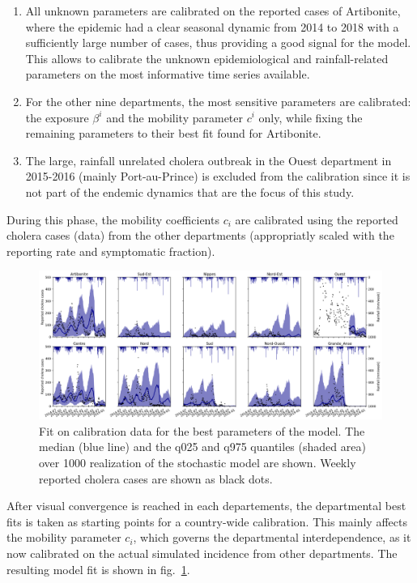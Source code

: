 \begin{enumerate}
    \item All unknown parameters are calibrated on the reported cases of Artibonite, where the epidemic had a clear seasonal dynamic from 2014 to 2018 with a sufficiently large number of cases, thus providing a good signal for the model.  This allows to calibrate the unknown epidemiological and rainfall-related parameters on the most informative time series available.
    \item For the other nine departments, the most sensitive parameters are calibrated: the exposure $\beta^i$ and the mobility parameter $c^i$ only, while fixing the remaining parameters to their best fit found for Artibonite.
    \item The large, rainfall unrelated cholera outbreak in the Ouest department in 2015-2016 (mainly Port-au-Prince)\cite{Rebaudet:NationalAlertresponseStrategy:2018} is excluded from the calibration since it is not part of the endemic dynamics that are the focus of  this study.
\end{enumerate}

During this phase, the mobility coefficients $c_i$ are calibrated using the reported cholera cases (data) from the other departments (appropriatly scaled with the reporting rate and symptomatic fraction).
\begin{figure}[htbp]
\begin{center}
\includegraphics[width=1.0\textwidth]{fig_cholera-haiti-ocv/fit.png}
\caption[Fit on calibration data for the best parameter of the model]{Fit on calibration data for the best parameters of the model. The median (blue line) and the q025 and q975 quantiles (shaded area) over 1000 realization of the stochastic model are shown. Weekly reported cholera cases are shown as black dots.}
\label{fitEPFL}
\end{center}
\end{figure}
After visual convergence is reached in each departements, the departmental best fits is taken as starting points for a country-wide calibration. This mainly affects the mobility parameter $c_i$, which governs the departmental interdependence, as it now calibrated on the actual simulated incidence from other departments. The resulting model fit is shown in fig.~\ref{fitEPFL}. 

